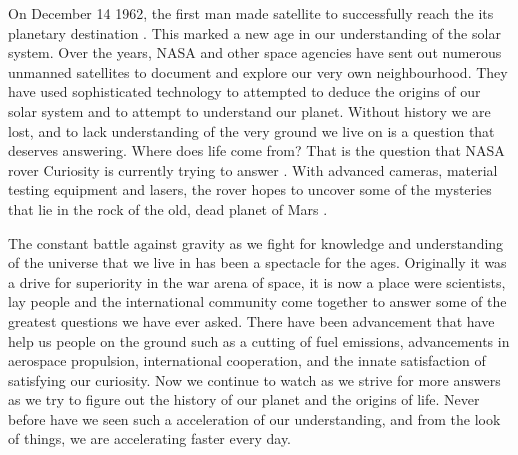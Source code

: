 \documentclass[a4paper,12pt]{article}
\begin{document}
On December 14 1962, the first man made satellite to successfully reach the its planetary destination \autocite{david2012}. This marked a new age in our understanding of the solar system. Over the years, NASA and other space agencies have sent out numerous unmanned satellites to document and explore our very own neighbourhood. They have used sophisticated technology to attempted to deduce the origins of our solar system and to attempt to understand our planet. Without history we are lost, and to lack understanding of the very ground we live on is a question that deserves answering. Where does life come from? That is the question that NASA rover Curiosity is currently trying to answer \autocite{gross2012}. With advanced cameras, material testing equipment and lasers, the rover hopes to uncover some of the mysteries that lie in the rock of the old, dead planet of Mars \autocite{gross2012}.

The constant battle against gravity as we fight for knowledge and understanding of the universe that we live in has been a spectacle for the ages. Originally it was a drive for superiority in the war arena of space, it is now a place were scientists, lay people and the international community  come together to answer some of the greatest questions we have ever asked. There have been advancement that have help us people on the ground such as a cutting of fuel emissions, advancements in aerospace propulsion, international cooperation, and the innate satisfaction of satisfying our curiosity. Now we continue to watch as we strive for more answers as we try to figure out the history of our planet and the origins of life. Never before have we seen such a acceleration of our understanding, and from the look of things, we are accelerating faster every day. 

\newpage
\printbibliography
\end{document}
